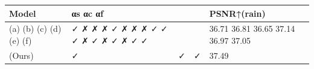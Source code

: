 \begin{tabular}{lllll}
\toprule
Model & αs αc αf &  &  & PSNR↑(rain) \\
\midrule
(a) (b) (c) (d) (e) (f) & ✓ ✗ ✗ ✗ ✓ ✗ ✗ ✗ ✓ ✓ ✓ ✗ ✓ ✗ ✓ ✗ ✓ ✓ &  &  & 36.71 36.81 36.65 37.14 36.97 37.05 \\
(Ours) & ✓ & ✓ & ✓ & 37.49 \\
\bottomrule
\end{tabular}
